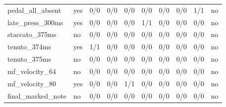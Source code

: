 \begin{tabular}{llrrrrrrrl}
pedal\_all\_absent & yes & 0/0 & 0/0 & 0/0 & 0/0 & 0/0 & 0/0 & 1/1 & no \\
late\_press\_300ms & yes & 0/0 & 0/0 & 0/0 & 1/1 & 0/0 & 0/0 & 0/0 & no \\
staccato\_375ms & no & 0/0 & 0/0 & 0/0 & 0/0 & 0/0 & 0/0 & 0/0 & no \\
tenuto\_374ms & yes & 1/1 & 0/0 & 0/0 & 0/0 & 0/0 & 0/0 & 0/0 & no \\
tenuto\_375ms & no & 0/0 & 0/0 & 0/0 & 0/0 & 0/0 & 0/0 & 0/0 & no \\
mf\_velocity\_64 & no & 0/0 & 0/0 & 0/0 & 0/0 & 0/0 & 0/0 & 0/0 & no \\
mf\_velocity\_80 & yes & 0/0 & 0/0 & 1/1 & 0/0 & 0/0 & 0/0 & 0/0 & no \\
final\_marked\_note & no & 0/0 & 0/0 & 0/0 & 0/0 & 0/0 & 0/0 & 0/0 & no \\
\hline
\end{tabular}
